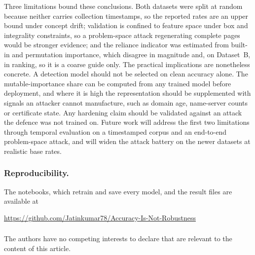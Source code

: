 \documentclass[runningheads]{llncs}
\begin{document}
Three limitations bound these conclusions. Both datasets were split at random
because neither carries collection timestamps, so the reported rates are an
upper bound under concept drift; validation is confined to feature space under
box and integrality constraints, so a problem-space attack regenerating complete
pages would be stronger evidence; and the reliance indicator was estimated from built-in and permutation importance,
which disagree in magnitude and, on Dataset~B, in ranking, so it is a coarse
guide only. The practical implications are
nonetheless concrete. A detection model should not be selected on clean accuracy
alone.
The mutable-importance share can be computed from any trained model before
deployment, and where it is high the representation should be supplemented with
signals an attacker cannot manufacture, such as domain age, name-server counts
or certificate state. Any hardening claim should be validated against an attack
the defence was not trained on. Future work will address the first two
limitations through temporal evaluation on a timestamped corpus and an end-to-end problem-space attack, and will widen the attack battery on the newer
datasets at realistic base rates.

\subsubsection{Reproducibility.}
The notebooks, which retrain and save every model, and the result files are
available at
\begin{sloppypar}
\noindent\url{https://github.com/Jatinkumar78/Accuracy-Is-Not-Robustness}
\end{sloppypar}

\begin{credits}
\subsubsection{\discintname}
The authors have no competing interests to declare that are relevant to the
content of this article.
\end{credits}
\end{document}
